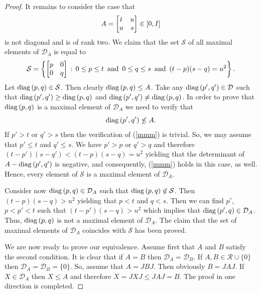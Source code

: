 \documentclass{article}
\begin{document}
\begin{proof}
It remains to consider the case that 
$$A =  \left[ \begin{matrix} t& u \cr u & s \cr \end{matrix} \right]  \in [0,I]
$$ 
is not diagonal and is of rank two. We claim that the set $\mathcal{S}$ of all maximal elements of
$\mathcal{D}_A$ is equal to
$$
\mathcal{S} = \left\{    \left[ \begin{matrix} p& 0 \cr 0 & q \cr \end{matrix} \right] \, : \, 0\le p \le t \ \, {\rm and} \ \, 0 \le q \le s \ \, {\rm and} \ \, (t-p)(s-q) = u^2 
\right\}. 
$$
Let ${\rm diag}\, (p,q) \in \mathcal{S}$. Then clearly ${\rm diag}\, (p,q) \le A$. Take any ${\rm diag}\, (p',q') \in \mathcal{D}$ such that ${\rm diag}\, (p',q') \ge {\rm diag}\, (p,q)$ and ${\rm diag}\, (p',q') \not= {\rm diag}\, (p,q)$. In order to prove that ${\rm diag}\, (p,q)$ is a maximal element of $\mathcal{D}_A$ we need to verify that \begin{equation}\label{mmm}{\rm diag}\, (p',q') \not\le A.\end{equation} If $p' > t$ or $q' > s$ then the verification of (\ref{mmm}) is trivial. So, we may assume that $p' \le t$ and $q' \le s$. We have $p' >p$ or $q' > q$ and therefore $(t-p')(s-q') < (t-p)(s-q) = u^2$ yielding that the determinant of $A - {\rm diag}\, (p',q')$ is negative, and consequently, (\ref{mmm}) holds in this case, as well. Hence, every element of $\mathcal{S}$ is a maximal element of $\mathcal{D}_A$.

Consider now ${\rm diag}\, (p,q) \in \mathcal{D}_A$ such that  ${\rm diag}\, (p,q) \not\in \mathcal{S}$. Then $(t-p)(s-q) > u^2$ yielding that $p <t$ and $q<s$. Then we can find $p'$, $p < p' < t$ such that 
$(t-p')(s-q) > u^2$ which implies that ${\rm diag}\, (p',q) \in \mathcal{D}_A$. Thus, ${\rm diag}\, (p,q)$ is not a maximal element of  $\mathcal{D}_A$. The claim that the set of maximal elements of $\mathcal{D}_A$  coincides with $\mathcal{S}$ has been proved.

We are now ready to prove our equivalence. Assume first that $A$ and $B$ satisfy the second condition. It is clear that if $A=B$ then 
$\mathcal{D}_A = \mathcal{D}_B$. If $A,B \in \mathcal{R} \cup \{ 0 \}$ then 
$\mathcal{D}_A = \mathcal{D}_B = \{ 0 \}$. So, assume that $A= JBJ$. Then obviously $B = JAJ$. If $X \in \mathcal{D}_A$ then $X \le A$ and therefore $X = JXJ  \le JAJ = B$. The proof in one direction is completed.


\end{proof}
\end{document}
